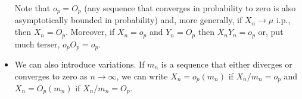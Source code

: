 \begin{itemize}
  Note that $o_p = O_p$ (any sequence that converges in probability to
  zero is also asymptotically bounded in probability) and, more
  generally, if $X_n \to \mu$ i.p., then $X_n = O_p$.  Moreover, if $X_n =
  o_p$ and $Y_n = O_p$ then $X_n Y_n = o_p$ or, put much terser, $o_p
  O_p = o_p$.

\item We can also introduce variations.  If $m_n$ is a sequence that
  either diverges or converges to zero as $n \to \infty$, we can write $X_n =
  o_p(m_n)$ if $X_n / m_n = o_p$ and $X_n = O_p(m_n)$ if $X_n / m_n =
  O_p$.

\end{itemize}

